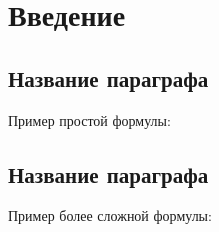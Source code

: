 \section{Введение}
\label{sec:Intro}

\subsection{Название параграфа}
\label{sec:}

Пример простой формулы:


\subsection{Название параграфа}
\label{sec:}

Пример более сложной формулы:

